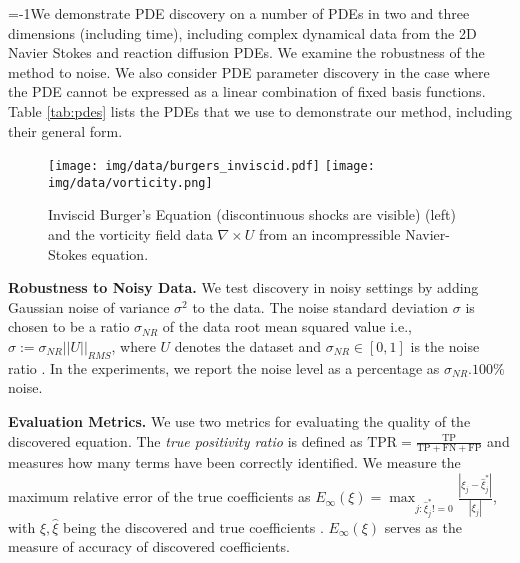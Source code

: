 
\looseness=-1We demonstrate PDE discovery on a number of PDEs in two and three dimensions (including time), including complex dynamical data from the 2D Navier Stokes and reaction diffusion PDEs. 
We examine the robustness of the method to noise.
We also consider PDE parameter discovery in the case where the PDE cannot be expressed as a linear combination of fixed basis functions.
Table \ref{tab:pdes} lists the PDEs that we use to demonstrate our method, including their general form.

\begin{figure}[h]
  \vskip -0.05in
  \centering
    \texttt{[image: img/data/burgers\_inviscid.pdf]}
    \texttt{[image: img/data/vorticity.png]}
  \vskip -0.1in
  \caption{Inviscid Burger's Equation (discontinuous shocks are visible) (left) and the vorticity field data $\nabla\times U$ from an incompressible Navier-Stokes equation.}
  \label{fig:fluid-data}
  \vskip -0.1in
\end{figure}

\textbf{Robustness to Noisy Data.} We test discovery in noisy settings by adding Gaussian noise of variance $\sigma^2$ to the data.
The noise standard deviation $\sigma$ is chosen to be a ratio $\sigma_{NR}$ of the data root mean squared value i.e., $\sigma := \sigma_{NR}||U||_{RMS}$, where $U$ denotes the dataset and $\sigma_{NR} \in [0,1]$ is the noise ratio \cite{messenger2021weak}.
In the experiments, we report the noise level as a percentage as $\sigma_{NR}. 100\%$ noise. 

\textbf{Evaluation Metrics.} 
We use two metrics for evaluating the quality of the discovered equation.
The \emph{true positivity ratio} is defined as $\text{TPR} = \frac{\text{TP}}{\text{TP}+\text{FN}+\text{FP}}$ \cite{lagergren2020learning} and measures how many terms have been correctly identified. 
We measure the maximum relative error of the true coefficients as $E_\infty(\xi) = \max_{j:\hat{\xi}_j^*!=0}  \frac{|\xi_j -\hat{\xi}^*_j|}{|\xi_j|}$, with $\xi,\hat{\xi}$ being the discovered and true coefficients \cite{messenger2021weak}.  
$E_\infty(\xi)$ serves as the measure of accuracy of discovered coefficients.



